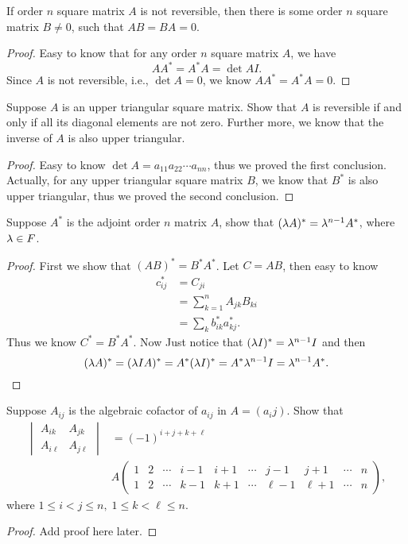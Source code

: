 \begin{pro}%
	If order $n$ square matrix $A$ is not reversible, then there is some order $n$ square matrix $B\neq 0$, such that $AB=BA=0$.
\end{pro}
\begin{proof}
	Easy to know that for any order $n$ square matrix $A$, we have
	\[A A^*=A^* A=\det A I.\]
	Since $A$ is not reversible, i.e., $\det A=0$, we know $A A^*=A^* A=0$.
\end{proof}

\begin{pro}%
	Suppose $A$ is an upper triangular square matrix. Show that $A$ is reversible if and only if all its diagonal elements are not zero. Further more, we know that the inverse of $A$ is also upper triangular.
\end{pro}
\begin{proof}
	Easy to know $\det A=a_{11} a_{22}\cdots a_{nn}$, thus we proved the first conclusion. Actually, for any upper triangular square matrix $B$, we know that $B^*$ is also upper triangular, thus we proved the second conclusion.
\end{proof}

\begin{pro}%
	Suppose $A^*$ is the adjoint order $n$ matrix $A$, show that $(\lambda A)^*=\lambda^{n-1} A^*$, where $\lambda\in F$.
\end{pro}
\begin{proof}
	First we show that $(AB)^*=B^*A^*$. Let $C=AB$, then easy to know
	\begin{align*}
	c_{ij}^*&=C_{ji}\\
			&=\sum_{k=1}^n A_{jk}B_{ki}\\
			&=\sum_{k} b_{ik}^* a_{kj}^*.
	\end{align*}
	Thus we know $C^*=B^*A^*$. Now Just notice that $(\lambda I)^*=\lambda^{n-1} I$ and then
	\[(\lambda A)^*=(\lambda I A)^*=A^*(\lambda I)^*=A^* \lambda^{n-1} I=\lambda^{n-1} A^*.\]
\end{proof}

\begin{pro}%
	Suppose $A_{ij}$ is the algebraic cofactor of $a_{ij}$ in $A=(a_ij)$. Show that
	\begin{align*}
	\begin{vmatrix}A_{ik}&A_{jk}\\A_{i\ell}&A_{j\ell}\end{vmatrix}&=
	(-1)^{i+j+k+\ell}\\
	&A\begin{pmatrix} 
	1&2&\cdots&i-1&i+1&\cdots&j-1&j+1&\cdots&n\\
	1&2&\cdots&k-1&k+1&\cdots&\ell-1&\ell+1&\cdots&n\end{pmatrix},
	\end{align*}
	where $1\leq i<j\leq n,\; 1\leq k<\ell\leq n$.
\end{pro}
\begin{proof}
Add proof here later.
\end{proof}

